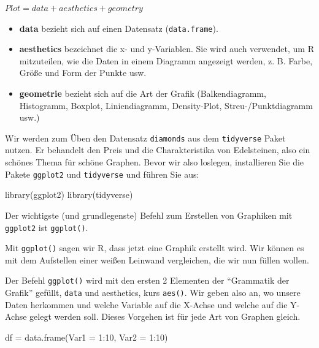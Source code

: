 \documentclass[
]{book}
\newenvironment{Shaded}{\begin{snugshade}}{\end{snugshade}}
\newcommand{\AttributeTok}[1]{\textcolor[rgb]{0.77,0.63,0.00}{#1}}
\newcommand{\DecValTok}[1]{\textcolor[rgb]{0.00,0.00,0.81}{#1}}
\newcommand{\FunctionTok}[1]{\textcolor[rgb]{0.00,0.00,0.00}{#1}}
\newcommand{\NormalTok}[1]{#1}
\newcommand{\OtherTok}[1]{\textcolor[rgb]{0.56,0.35,0.01}{#1}}
\newcommand{\SpecialCharTok}[1]{\textcolor[rgb]{0.00,0.00,0.00}{#1}}
\begin{document}
\(Plot = data + aesthetics + geometry\)

\begin{itemize}
\item
  \textbf{data} bezieht sich auf einen Datensatz (\texttt{data.frame}).
\item
  \textbf{aesthetics} bezeichnet die x- und y-Variablen. Sie wird auch verwendet, um R mitzuteilen, wie die Daten in einem Diagramm angezeigt werden, z. B. Farbe, Größe und Form der Punkte usw.
\item
  \textbf{geometrie} bezieht sich auf die Art der Grafik (Balkendiagramm, Histogramm, Boxplot, Liniendiagramm, Density-Plot, Streu-/Punktdiagramm usw.)
\end{itemize}

Wir werden zum Üben den Datensatz \texttt{diamonds} aus dem \texttt{tidyverse} Paket nutzen. Er behandelt den Preis und die Charakteristika von Edelsteinen, also ein schönes Thema für schöne Graphen. Bevor wir also loslegen, installieren Sie die Pakete \texttt{ggplot2} und \texttt{tidyverse} und führen Sie aus:

\begin{Shaded}
\begin{Highlighting}[]
\FunctionTok{library}\NormalTok{(ggplot2)}
\FunctionTok{library}\NormalTok{(tidyverse)}
\end{Highlighting}
\end{Shaded}

Der wichtigste (und grundlegenste) Befehl zum Erstellen von Graphiken mit \texttt{ggplot2} ist \texttt{ggplot()}.

Mit \texttt{ggplot()} sagen wir R, dass jetzt eine Graphik erstellt wird. Wir können es mit dem Aufstellen einer weißen Leinwand vergleichen, die wir nun füllen wollen.

Der Befehl \texttt{ggplot()} wird mit den ersten 2 Elementen der ``Grammatik der Grafik'' gefüllt, \texttt{data} und aesthetics, kurs \texttt{aes()}. Wir geben also an, wo unsere Daten herkommen und welche Variable auf die X-Achse und welche auf die Y-Achse gelegt werden soll. Dieses Vorgehen ist für jede Art von Graphen gleich.

\begin{Shaded}
\begin{Highlighting}[]
\NormalTok{df }\OtherTok{=} \FunctionTok{data.frame}\NormalTok{(}\AttributeTok{Var1 =} \DecValTok{1}\SpecialCharTok{:}\DecValTok{10}\NormalTok{,}
                \AttributeTok{Var2 =} \DecValTok{1}\SpecialCharTok{:}\DecValTok{10}\NormalTok{)}
\end{Highlighting}
\end{Shaded}
\end{document}

